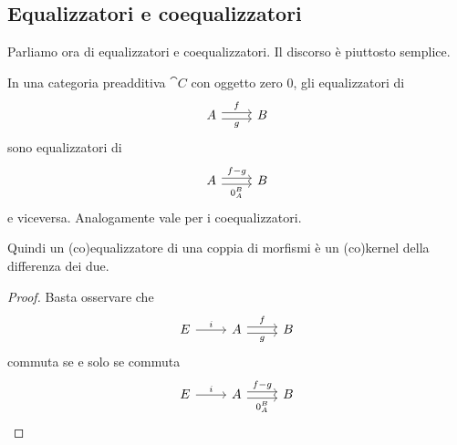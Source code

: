 \subsection{Equalizzatori e coequalizzatori}

Parliamo ora di equalizzatori e coequalizzatori. Il discorso è piuttosto
semplice.

\begin{proposition}\label{proposition:EqualizersAreKernels}
  In una categoria preadditiva \(\cat C\) con oggetto zero \(0\), gli
  equalizzatori di
  \[
    \begin{tikzcd}
      A \ar["f", r, shift left] \ar["g", r, shift right, swap] & B
    \end{tikzcd}
  \]
  sono equalizzatori di
  \[
    \begin{tikzcd}
      A \ar["{f-g}", r, shift left] \ar["{0_A^B}", r, shift right, swap]
      & B
    \end{tikzcd}
  \]
  e viceversa. Analogamente vale per i coequalizzatori.
\end{proposition}

Quindi un (co)equalizzatore di una coppia di morfismi è un (co)kernel
della differenza dei due.

\begin{proof}
  Basta osservare che
  \[
    \begin{tikzcd}
      E \ar["i", r] & A \ar["f", r, shift left] \ar["g", r, shift right,
      swap] & B
    \end{tikzcd}
  \]
  commuta se e solo se commuta
  \[
    \begin{tikzcd}
      E \ar["i", r] & A \ar["{f-g}", r, shift left] \ar["{0_A^B}", r,
      shift right, swap] & B
    \end{tikzcd}
    \qedhere\]
\end{proof}



